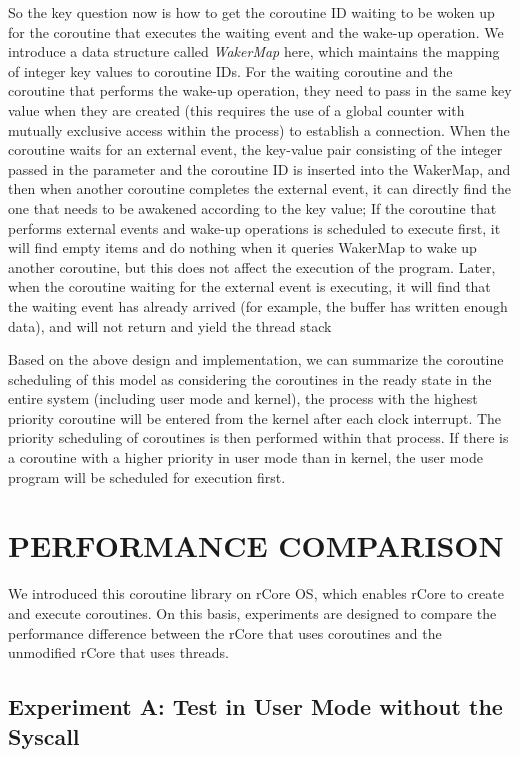 \documentclass[10pt]{article}
\begin{document}
So the key question now is how to get the coroutine ID waiting to be woken up for the coroutine that executes the waiting event and the wake-up operation. We introduce a data structure called \textit{WakerMap} here, which maintains the mapping of integer key values to coroutine IDs. For the waiting coroutine and the coroutine that performs the wake-up operation, they need to pass in the same key value when they are created (this requires the use of a global counter with mutually exclusive access within the process) to establish a connection. When the coroutine waits for an external event, the key-value pair consisting of the integer passed in the parameter and the coroutine ID is inserted into the WakerMap, and then when another coroutine completes the external event, it can directly find the one that needs to be awakened according to the key value; If the coroutine that performs external events and wake-up operations is scheduled to execute first, it will find empty items and do nothing when it queries WakerMap to wake up another coroutine, but this does not affect the execution of the program. Later, when the coroutine waiting for the external event is executing, it will find that the waiting event has already arrived (for example, the buffer has written enough data), and will not return and yield the thread stack

Based on the above design and implementation, we can summarize the coroutine scheduling of this model as considering the coroutines in the ready state in the entire system (including user mode and kernel), the process with the highest priority coroutine will be entered from the kernel after each clock interrupt. The priority scheduling of coroutines is then performed within that process. If there is a coroutine with a higher priority in user mode than in kernel, the user mode program will be scheduled for execution first.


\section{PERFORMANCE COMPARISON}

We introduced this coroutine library on rCore OS, which enables rCore to create and execute coroutines. On this basis, experiments are designed to compare the performance difference between the rCore that uses coroutines and the unmodified rCore that uses threads.

\subsection{Experiment A: Test in User Mode without the Syscall}
\end{document}
